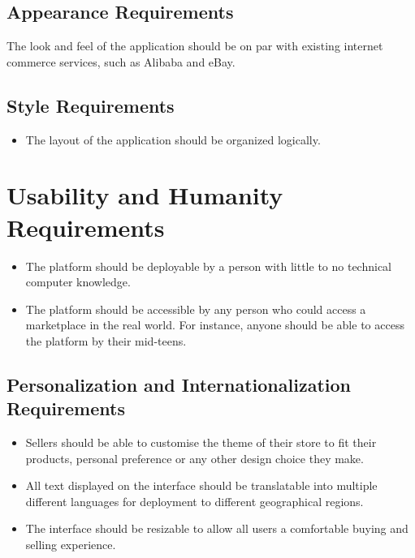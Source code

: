 \documentclass{article}
\begin{document}
\subsection{Appearance Requirements}
The look and feel of the application should be on par with existing internet commerce services, such as Alibaba and eBay. 

\subsection{Style Requirements}
\begin{itemize}
\item
The layout of the application should be organized logically.
\end{itemize}

\section{Usability and Humanity Requirements}
\begin{itemize}
\item
The platform should be deployable by a person with little to no technical computer knowledge.

\item
The platform should be accessible by any person who could access a marketplace in the real world. For instance, anyone should be able to access the platform by their mid-teens.
\end{itemize}

\subsection{Personalization and Internationalization Requirements}
\begin{itemize}
\item
Sellers should be able to customise the theme of their store to fit their products, personal preference or any other design choice they make. 

\item
All text displayed on the interface should be translatable into multiple different languages for deployment to different geographical regions.

\item
The interface should be resizable to allow all users a comfortable buying and selling experience.
\end{itemize}
\end{document}
